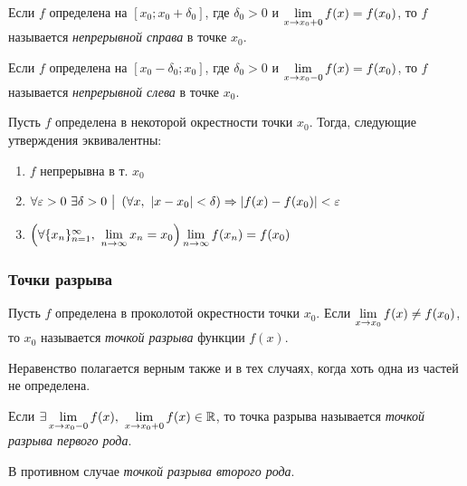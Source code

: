 \begin{definition}
	Если $f$ определена на $[x_0; x_0 + \delta_0]$, где $\delta_0 > 0$ и $\lim\limits_{x \to x_0 + 0} f(x) = f(x_0)$, то $f$ называется \textit{непрерывной справа} в точке $x_0$.
\end{definition}

\begin{definition}
	Если $f$ определена на $[x_0 - \delta_0; x_0]$, где $\delta_0 > 0$ и $\lim\limits_{x \to x_0 - 0} f(x) = f(x_0)$, то $f$ называется \textit{непрерывной слева} в точке $x_0$.
\end{definition}

\begin{theorem}
	Пусть $f$ определена в некоторой окрестности точки $x_0$. Тогда, следующие утверждения эквивалентны:
	\begin{enumerate}
		\item $f$ непрерывна в т. $x_0$
		\item $\forall \varepsilon > 0\ \exists \delta > 0 \ \big|\  \left(\forall x,\ |x - x_0| < \delta\right) \Rightarrow |f(x) - f(x_0)| < \varepsilon$
		\item $\left(\forall \{x_n\}_{n = 1}^\infty,\ \liml_{n \to \infty} x_n = x_0\right) \liml_{n \to \infty} f(x_n) = f(x_0)$
	\end{enumerate}
\end{theorem}

\subsubsection*{Точки разрыва}

\begin{definition}
	Пусть $f$ определена в проколотой окрестности точки $x_0$. Если $\lim\limits_{x \to x_0} f(x) \neq f(x_0)$, то $x_0$ называется \textit{точкой разрыва} функции $f(x)$.
\end{definition}

\begin{note}
	Неравенство полагается верным также и в тех случаях, когда хоть одна из частей не определена.
\end{note}

\begin{definition}
	Если $\exists \liml_{x \to x_0-0} f(x),\ \liml_{x \to x_0+0} f(x) \in \R$, то точка разрыва называется \textit{точкой разрыва первого рода}.
	
	В противном случае \textit{точкой разрыва второго рода}.
\end{definition}

